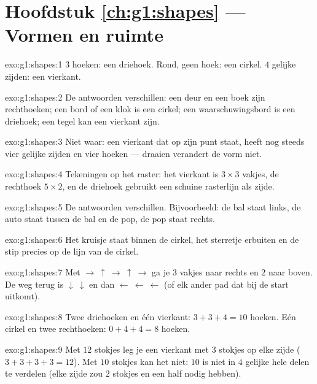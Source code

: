 \section*{Hoofdstuk \ref{ch:g1:shapes} --- Vormen en ruimte}

\begin{solution}{exo:g1:shapes:1}
$3$ hoeken: een driehoek. Rond, geen hoek: een cirkel. $4$ gelijke
zijden: een vierkant.
\end{solution}

\begin{solution}{exo:g1:shapes:2}
De antwoorden verschillen: een deur en een boek zijn rechthoeken; een
bord of een klok is een cirkel; een waarschuwingsbord is een driehoek;
een tegel kan een vierkant zijn.
\end{solution}

\begin{solution}{exo:g1:shapes:3}
Niet waar: een vierkant dat op zijn punt staat, heeft nog steeds vier
gelijke zijden en vier hoeken --- draaien verandert de vorm niet.
\end{solution}

\begin{solution}{exo:g1:shapes:4}
Tekeningen op het raster: het vierkant is $3 \times 3$ vakjes, de
rechthoek $5 \times 2$, en de driehoek gebruikt een schuine rasterlijn
als zijde.
\end{solution}

\begin{solution}{exo:g1:shapes:5}
De antwoorden verschillen. Bijvoorbeeld: de bal staat links, de auto
staat tussen de bal en de pop, de pop staat rechts.
\end{solution}

\begin{solution}{exo:g1:shapes:6}
Het kruisje staat binnen de cirkel, het sterretje erbuiten en de stip
precies op de lijn van de cirkel.
\end{solution}

\begin{solution}{exo:g1:shapes:7}
Met $\to\ \uparrow\ \to\ \uparrow\ \to$ ga je $3$ vakjes naar rechts en
$2$ naar boven. De weg terug is $\downarrow\ \downarrow$ en dan
$\leftarrow\ \leftarrow\ \leftarrow$ (of elk ander pad dat bij de start
uitkomt).
\end{solution}

\begin{solution}{exo:g1:shapes:8}
Twee driehoeken en één vierkant: $3 + 3 + 4 = 10$ hoeken. Eén cirkel en
twee rechthoeken: $0 + 4 + 4 = 8$ hoeken.
\end{solution}

\begin{solution}{exo:g1:shapes:9}
Met $12$ stokjes leg je een vierkant met $3$ stokjes op elke zijde
($3 + 3 + 3 + 3 = 12$). Met $10$ stokjes kan het niet: $10$ is niet in
$4$ gelijke hele delen te verdelen (elke zijde zou $2$ stokjes en een
half nodig hebben).
\end{solution}
